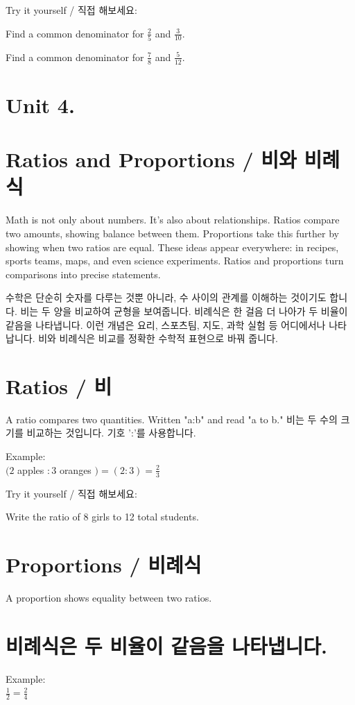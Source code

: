 \documentclass[10pt]{article}
\begin{document}
Try it yourself / 직접 해보세요:

Find a common denominator for $\frac{2}{5}$ and $\frac{3}{10}$.

Find a common denominator for $\frac{7}{8}$ and $\frac{5}{12}$.

\section*{Unit 4.}
\section*{Ratios and Proportions / 비와 비례식}
Math is not only about numbers. It's also about relationships. Ratios compare two amounts, showing balance between them. Proportions take this further by showing when two ratios are equal. These ideas appear everywhere: in recipes, sports teams, maps, and even science experiments. Ratios and proportions turn comparisons into precise statements.

수학은 단순히 숫자를 다루는 것뿐 아니라, 수 사이의 관계를 이해하는 것이기도 합니다. 비는 두 양을 비교하여 균형을 보여줍니다. 비례식은 한 걸음 더 나아가 두 비율이 같음을 나타냅니다. 이런 개념은 요리, 스포츠팀, 지도, 과학 실험 등 어디에서나 나타납니다. 비와 비례식은 비교를 정확한 수학적 표현으로 바꿔 줍니다.

\section*{Ratios / 비}
A ratio compares two quantities. Written "a:b" and read "a to b." 비는 두 수의 크기를 비교하는 것입니다. 기호 ':'를 사용합니다.

Example:\\
$(2$ apples $: 3$ oranges $)=(2: 3)=\frac{2}{3}$

Try it yourself / 직접 해보세요:

Write the ratio of 8 girls to 12 total students.

\section*{Proportions / 비례식}
A proportion shows equality between two ratios.

\section*{비례식은 두 비율이 같음을 나타냅니다.}
Example:\\
$\frac{1}{2}=\frac{2}{4}$
\end{document}
